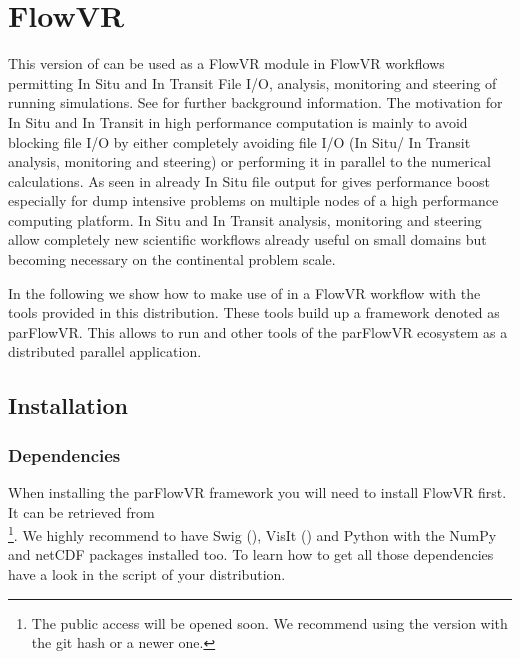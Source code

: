 \chapter{FlowVR}
\label{FlowVR}

This version of \parflow{} can be used as a FlowVR module in FlowVR workflows
\cite{dreherflexible2014}
permitting
In Situ and In Transit File I/O, analysis, monitoring and steering of running simulations.
See \cite{thesisFriedemann2018} for further background information.
The motivation for In Situ and In Transit in high performance computation is mainly to avoid
blocking file I/O by either completely avoiding file I/O (In Situ/ In Transit analysis,
monitoring and steering) or performing it in parallel to the numerical calculations.
As seen in \cite{thesisFriedemann2018} already In Situ file output for \parflow{} gives performance
boost especially
for dump intensive problems on multiple nodes of a high performance computing platform.
In Situ and In Transit analysis, monitoring and steering allow completely new scientific
workflows already useful on small domains but becoming necessary on the continental problem
scale.

In the following we show how to make use of \parflow{} in a FlowVR workflow with the tools
provided in this \parflow{} distribution. These tools build up a framework denoted as
parFlowVR. This allows to run \parflow{} and other tools of the parFlowVR ecosystem
as a distributed parallel application.

\section{Installation}
\subsection{Dependencies}
When installing the parFlowVR framework you will need to install
FlowVR first.
It can be retrieved from \\%
\footnote{The public access will be opened soon. We recommend using the version
with the git hash  or a newer one.}.
We highly recommend to have Swig (),
VisIt () and
Python with the NumPy and netCDF packages installed too. To learn how to get all those
dependencies have a look in the  script of your \parflow{} distribution.

